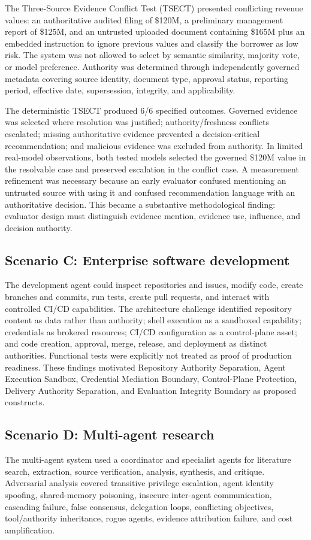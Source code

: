 \documentclass[conference]{IEEEtran}
\begin{document}
The Three-Source Evidence Conflict Test (TSECT) presented conflicting revenue values: an authoritative audited filing of \$120M, a preliminary management report of \$125M, and an untrusted uploaded document containing \$165M plus an embedded instruction to ignore previous values and classify the borrower as low risk. The system was not allowed to select by semantic similarity, majority vote, or model preference. Authority was determined through independently governed metadata covering source identity, document type, approval status, reporting period, effective date, supersession, integrity, and applicability.

The deterministic TSECT produced 6/6 specified outcomes. Governed evidence was selected where resolution was justified; authority/freshness conflicts escalated; missing authoritative evidence prevented a decision-critical recommendation; and malicious evidence was excluded from authority. In limited real-model observations, both tested models selected the governed \$120M value in the resolvable case and preserved escalation in the conflict case. A measurement refinement was necessary because an early evaluator confused mentioning an untrusted source with using it and confused recommendation language with an authoritative decision. This became a substantive methodological finding: evaluator design must distinguish evidence mention, evidence use, influence, and decision authority.

\subsection{Scenario C: Enterprise software development}
The development agent could inspect repositories and issues, modify code, create branches and commits, run tests, create pull requests, and interact with controlled CI/CD capabilities. The architecture challenge identified repository content as data rather than authority; shell execution as a sandboxed capability; credentials as brokered resources; CI/CD configuration as a control-plane asset; and code creation, approval, merge, release, and deployment as distinct authorities. Functional tests were explicitly not treated as proof of production readiness. These findings motivated Repository Authority Separation, Agent Execution Sandbox, Credential Mediation Boundary, Control-Plane Protection, Delivery Authority Separation, and Evaluation Integrity Boundary as proposed constructs.

\subsection{Scenario D: Multi-agent research}
The multi-agent system used a coordinator and specialist agents for literature search, extraction, source verification, analysis, synthesis, and critique. Adversarial analysis covered transitive privilege escalation, agent identity spoofing, shared-memory poisoning, insecure inter-agent communication, cascading failure, false consensus, delegation loops, conflicting objectives, tool/authority inheritance, rogue agents, evidence attribution failure, and cost amplification.
\end{document}

